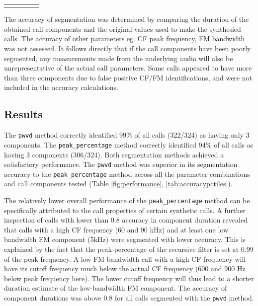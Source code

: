 \documentclass[
]{book}
\begin{document}
\begin{table}
\begin{longtable}{|p{0.75in}|p{0.75in}|p{0.75in}|p{0.75in}|p{0.75in}}
\noalign{\global\setlength{\arrayrulewidth}{2pt}}\arrayrulecolor[HTML]{000000}\cline{1-5}

\end{longtable}

\end{table}

The accuracy of segmentation was determined by comparing the duration of the obtained call components and the original values used to make the synthesied calls. The accuracy of other parameters eg. CF peak frequency, FM bandwidth was not assessed. It follows directly that if the call components have been poorly segmented, any measurements made from the underlying audio will also be unrepresentative of the actual call parameters. Some calls appeared to have more than three components due to false positive CF/FM identifications, and were not included in the accuracy calculations.

\hypertarget{results}{%
\subsection{Results}\label{results}}

The \texttt{pwvd} method correctly identified 99\% of all calls (322/324) as having only 3 components. The \texttt{peak\_percentage} method correctly identified 94\% of all calls as having 3 components (306/324). Both segmentation methods achieved a satisfactory performance. The \texttt{pwvd} method was superior in its segmentation accuracy to the \texttt{peak\_percentage} method across all the parameter combinations and call components tested (Table \ref{fig:performance}, \ref{tab:accuracypctiles}).

The relatively lower overall performance of the \texttt{peak\_percentage} method can be specifically attributed to the call properties of certain synthetic calls. A further inspection of calls with lower than 0.8 accuracy in component duration revealed that calls with a high CF frequency (60 and 90 kHz) and at least one low bandwidth FM component (5kHz) were segmented with lower accuracy. This is explained by the fact that the peak-percentage of the recursive filter is set at 0.99 of the peak frequency. A low FM bandwidth call with a high CF frequency will have its cutoff frequency much below the actual CF frequency (600 and 900 Hz below peak frequency here). The lower cutoff frequency will thus lead to a shorter duration estimate of the low-bandwidth FM component. The accuracy of component durations was above 0.8 for all calls segmented with the \texttt{pwvd} method.
\end{document}
